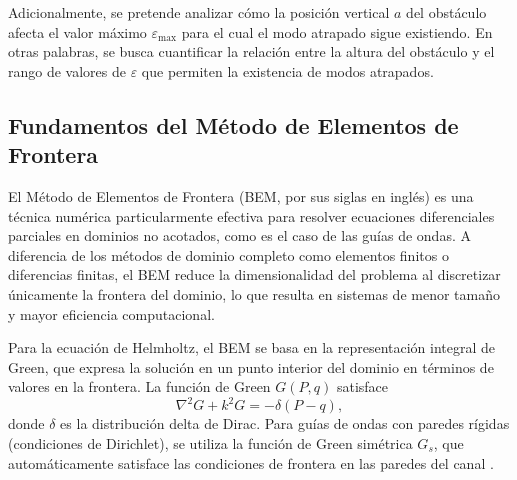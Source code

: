 \documentclass[11pt]{article}
\begin{document}
Adicionalmente, se pretende analizar cómo la posición vertical $a$ del obstáculo afecta el valor máximo $\varepsilon_{\max}$ para el cual el modo atrapado sigue existiendo. En otras palabras, se busca cuantificar la relación entre la altura del obstáculo y el rango de valores de $\varepsilon$ que permiten la existencia de modos atrapados.

\subsection{Fundamentos del Método de Elementos de Frontera}

El Método de Elementos de Frontera \cite{Pozrikidis2002} (BEM, por sus siglas en inglés) es una técnica numérica particularmente efectiva para resolver ecuaciones diferenciales parciales en dominios no acotados, como es el caso de las guías de ondas. A diferencia de los métodos de dominio completo como elementos finitos o diferencias finitas, el BEM reduce la dimensionalidad del problema al discretizar únicamente la frontera del dominio, lo que resulta en sistemas de menor tamaño y mayor eficiencia computacional.

Para la ecuación de Helmholtz, el BEM se basa en la representación integral de Green, que expresa la solución en un punto interior del dominio en términos de valores en la frontera. La función de Green $G(P,q)$ satisface
\begin{equation}
\nabla^2 G + k^2 G = -\delta(P-q),
\label{eq:green_basic}
\end{equation}
donde $\delta$ es la distribución delta de Dirac. Para guías de ondas con paredes rígidas (condiciones de Dirichlet), se utiliza la función de Green simétrica $G_s$, que automáticamente satisface las condiciones de frontera en las paredes del canal \cite{Linton1992}.
\end{document}
